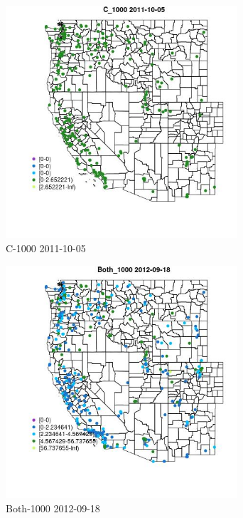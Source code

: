 \begin{figure} 
\centering  
\includegraphics[width=0.77\textwidth]{Code_Outputs/ML_input_report_ML_input_PM25_Step5_part_d_de_duplicated_aves_ML_input_MapObsC_10002011-10-05.jpg} 
\caption{\label{fig:ML_input_report_ML_input_PM25_Step5_part_d_de_duplicated_aves_ML_inputMapObsC_10002011-10-05}C-1000 2011-10-05} 
\end{figure} 
 

\begin{figure} 
\centering  
\includegraphics[width=0.77\textwidth]{Code_Outputs/ML_input_report_ML_input_PM25_Step5_part_d_de_duplicated_aves_ML_input_MapObsBoth_10002012-09-18.jpg} 
\caption{\label{fig:ML_input_report_ML_input_PM25_Step5_part_d_de_duplicated_aves_ML_inputMapObsBoth_10002012-09-18}Both-1000 2012-09-18} 
\end{figure} 
 

